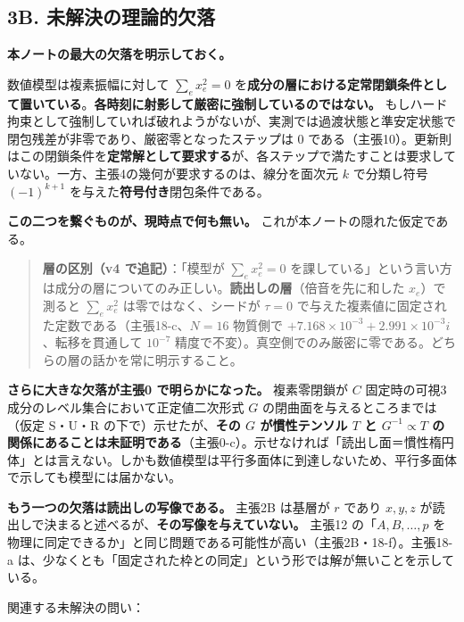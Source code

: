 \documentclass[
  10pt,
]{ltjsarticle}
\begin{document}
\subsection{3B.
未解決の理論的欠落}\label{b.-ux672aux89e3ux6c7aux306eux7406ux8ad6ux7684ux6b20ux843d}

\textbf{本ノートの最大の欠落を明示しておく。}

数値模型は複素振幅に対して \(\sum_e x_e^2 = 0\)
を\textbf{成分の層における定常閉鎖条件として置いている}。\textbf{各時刻に射影して厳密に強制しているのではない。}
もしハード拘束として強制していれば破れようがないが、実測では過渡状態と準安定状態で閉包残差が非零であり、厳密零となったステップは
\(0\)
である（主張10）。更新則はこの閉鎖条件を\textbf{定常解として要求する}が、各ステップで満たすことは要求していない。一方、主張4の幾何が要求するのは、線分を面次元
\(k\) で分類し符号 \((-1)^{k+1}\)
を与えた\textbf{符号付き}閉包条件である。

\textbf{この二つを繋ぐものが、現時点で何も無い。}
これが本ノートの隠れた仮定である。

\begin{quote}
\textbf{層の区別（v4 で追記）}：「模型が \(\sum_e x_e^2 = 0\)
を課している」という言い方は成分の層についてのみ正しい。\textbf{読出しの層}（倍音を先に和した
\(x_e\)）で測ると \(\sum_e x_e^2\) は零ではなく、シードが \(\tau=0\)
で与えた複素値に固定された定数である（主張18-c、\(N=16\) 物質側で
\(+7.168\times10^{-3} + 2.991\times10^{-3}i\)、転移を貫通して
\(10^{-7}\)
精度で不変）。真空側でのみ厳密に零である。どちらの層の話かを常に明示すること。
\end{quote}

\textbf{さらに大きな欠落が主張0 で明らかになった。} 複素零閉鎖が \(C\)
固定時の可視3成分のレベル集合において正定値二次形式 \(G\)
の閉曲面を与えるところまでは（仮定 S・U・R
の下で）示せたが、\textbf{その \(G\) が慣性テンソル \(T\) と
\(G^{-1}\propto T\)
の関係にあることは未証明である}（主張0-c）。示せなければ「読出し面＝慣性楕円体」とは言えない。しかも数値模型は平行多面体に到達しないため、平行多面体で示しても模型には届かない。

\textbf{もう一つの欠落は読出しの写像である。} 主張2B は基層が \(r\)
であり \(x,y,z\)
が読出しで決まると述べるが、\textbf{その写像を与えていない。} 主張12
の「\(A,B,\dots,p\)
を物理に同定できるか」と同じ問題である可能性が高い（主張2B・18-f）。主張18-a
は、少なくとも「固定された枠との同定」という形では解が無いことを示している。

関連する未解決の問い：
\end{document}
